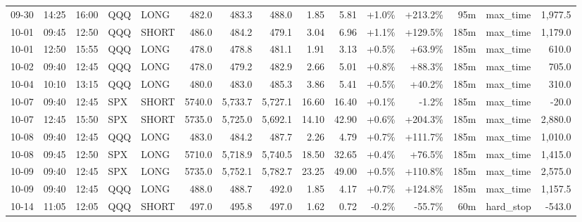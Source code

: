 \documentclass[11pt,a4paper,twoside]{article}
\begin{document}
\begin{landscape}
\begin{center}
\begin{longtable}{>{\color{txtmain}}l l l l l r r r r r r r r >{\color{txtmain}}l r}
09-30 & 14:25 & 16:00 & QQQ & LONG & 482.0 & 483.3 & 488.0 & 1.85 & 5.81 & \textcolor{wingreen}{+1.0\%} & \textcolor{wingreen}{+213.2\%} & 95m & max\_time & \textcolor{wingreen}{1,977.5} \\
10-01 & 09:45 & 12:50 & QQQ & SHORT & 486.0 & 484.2 & 479.1 & 3.04 & 6.96 & \textcolor{wingreen}{+1.1\%} & \textcolor{wingreen}{+129.5\%} & 185m & max\_time & \textcolor{wingreen}{1,179.0} \\
10-01 & 12:50 & 15:55 & QQQ & LONG & 478.0 & 478.8 & 481.1 & 1.91 & 3.13 & \textcolor{wingreen}{+0.5\%} & \textcolor{wingreen}{+63.9\%} & 185m & max\_time & \textcolor{wingreen}{610.0} \\
10-02 & 09:40 & 12:45 & QQQ & LONG & 478.0 & 479.2 & 482.9 & 2.66 & 5.01 & \textcolor{wingreen}{+0.8\%} & \textcolor{wingreen}{+88.3\%} & 185m & max\_time & \textcolor{wingreen}{705.0} \\
10-04 & 10:10 & 13:15 & QQQ & LONG & 480.0 & 483.0 & 485.3 & 3.86 & 5.41 & \textcolor{wingreen}{+0.5\%} & \textcolor{wingreen}{+40.2\%} & 185m & max\_time & \textcolor{wingreen}{310.0} \\
10-07 & 09:40 & 12:45 & SPX & SHORT & 5740.0 & 5,733.7 & 5,727.1 & 16.60 & 16.40 & \textcolor{wingreen}{+0.1\%} & \textcolor{lossred}{-1.2\%} & 185m & max\_time & \textcolor{lossred}{-20.0} \\
10-07 & 12:45 & 15:50 & SPX & SHORT & 5735.0 & 5,725.0 & 5,692.1 & 14.10 & 42.90 & \textcolor{wingreen}{+0.6\%} & \textcolor{wingreen}{+204.3\%} & 185m & max\_time & \textcolor{wingreen}{2,880.0} \\
10-08 & 09:40 & 12:45 & QQQ & LONG & 483.0 & 484.2 & 487.7 & 2.26 & 4.79 & \textcolor{wingreen}{+0.7\%} & \textcolor{wingreen}{+111.7\%} & 185m & max\_time & \textcolor{wingreen}{1,010.0} \\
10-08 & 09:45 & 12:50 & SPX & LONG & 5710.0 & 5,718.9 & 5,740.5 & 18.50 & 32.65 & \textcolor{wingreen}{+0.4\%} & \textcolor{wingreen}{+76.5\%} & 185m & max\_time & \textcolor{wingreen}{1,415.0} \\
10-09 & 09:40 & 12:45 & SPX & LONG & 5735.0 & 5,752.1 & 5,782.7 & 23.25 & 49.00 & \textcolor{wingreen}{+0.5\%} & \textcolor{wingreen}{+110.8\%} & 185m & max\_time & \textcolor{wingreen}{2,575.0} \\
10-09 & 09:40 & 12:45 & QQQ & LONG & 488.0 & 488.7 & 492.0 & 1.85 & 4.17 & \textcolor{wingreen}{+0.7\%} & \textcolor{wingreen}{+124.8\%} & 185m & max\_time & \textcolor{wingreen}{1,157.5} \\
10-14 & 11:05 & 12:05 & QQQ & SHORT & 497.0 & 495.8 & 497.0 & 1.62 & 0.72 & \textcolor{lossred}{-0.2\%} & \textcolor{lossred}{-55.7\%} & 60m & hard\_stop & \textcolor{lossred}{-543.0} \\

\end{longtable}
\end{center}
\end{landscape}
\end{document}
